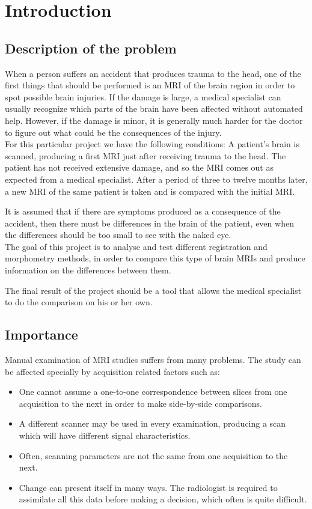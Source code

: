 \chapter{Introduction}

\section{Description of the problem}
When a person suffers an accident that produces trauma to the head, one of the first things that should be performed is an MRI of the brain region in order to spot possible brain injuries. If the damage is large, a medical specialist can usually recognize which parts of the brain have been affected without automated help. However, if the damage is minor, it is generally much harder for the doctor to figure out what could be the consequences of the injury. \\

For this particular project we have the following conditions: A patient's brain is scanned, producing a first MRI just after receiving trauma to the head. The patient has not received extensive damage, and so the MRI comes out as expected from a medical specialist. After a period of three to twelve months later, a new MRI of the same patient is taken and is compared with the initial MRI.

It is assumed that if there are symptoms produced as a consequence of the accident, then there must be differences in the brain of the patient, even when the differences should be too small to see with the naked eye.\\


The goal of this project is to analyse and test different registration and morphometry methods, in order to compare this type of brain MRIs and produce information on the differences between them. 

The final result of the project should be a tool that allows the medical specialist to do the comparison on his or her own.


\section{Importance}

Manual examination of MRI studies suffers from many problems. The study can be affected specially by acquisition related factors such as:
\begin{itemize}
\item One cannot assume a one-to-one correspondence between slices from one acquisition to the next in order to make side-by-side comparisons.
\item A different scanner may be used in every examination, producing a scan which will have different signal characteristics.
\item Often, scanning parameters are not the same from one acquisition to the next.
\item Change can present itself in many ways. The radiologist is required to assimilate all this data before making a decision, which often is quite difficult.
\end{itemize}


